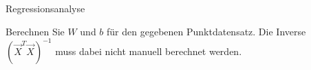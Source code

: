 \begin{task}[credit=7]{Regressionsanalyse}
\begin{subtask}[title=Herleitung,points=5]
\begin{solution}
\end{solution}
\end{subtask}


\begin{subtask}[title=Parameterbestimmung,points=2]
Berechnen Sie $W$ und $b$ für den gegebenen Punktdatensatz. Die Inverse $(\vec{X}^{T}\vec{X})^{-1}$ muss dabei nicht manuell berechnet werden.
\begin{solution}
\end{solution}
\end{subtask}
\end{task}
